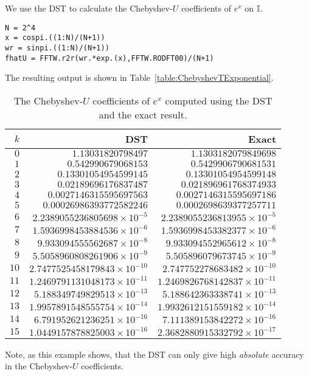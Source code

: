 \begin{example}\label{Example:DST}
We use the DST to calculate the Chebyshev-$U$ coefficients of $e^x$ on $\mathbb{I}$.
\begin{verbatim}
N = 2^4
x = cospi.((1:N)/(N+1))
wr = sinpi.((1:N)/(N+1))
fhatU = FFTW.r2r(wr.*exp.(x),FFTW.RODFT00)/(N+1)
\end{verbatim}
The resulting output is shown in Table~\ref{table:ChebyshevTExponential}.
\begin{table}[htdp]
\caption{The Chebyshev-$U$ coefficients of $e^x$ computed using the DST and the exact result.}
\begin{center}
\begin{tabular}{rrr}
\hline
$k$ & DST & Exact\\
\hline
$0$ & $1.13031820798497$ & $1.1303182079849698$\\
$1$ & $0.542990679068153$ & $0.5429906790681531$\\
$2$ & $0.13301054954599145$ & $0.13301054954599148$\\
$3$ & $0.02189696176837487$ & $0.021896961768374933$\\
$4$ & $0.0027146315595697563$ & $0.0027146315595697186$\\
$5$ & $0.00026986393772582246$ & $0.0002698639377257711$\\
$6$ & $2.2389055236805698\times10^{-5}$ & $2.2389055236813955\times10^{-5}$\\
$7$ & $1.5936998453884536\times10^{-6}$ & $1.5936998453382377\times10^{-6}$\\
$8$ & $9.933094555562687\times10^{-8}$ & $9.933094552965612\times10^{-8}$\\
$9$ & $5.5058960808261906\times10^{-9}$ & $5.505896079673745\times10^{-9}$\\
$10$ & $2.7477525458179843\times10^{-10}$ & $2.747752278683482\times10^{-10}$\\
$11$ & $1.2469791131048173\times10^{-11}$ & $1.2469826768142837\times10^{-11}$\\
$12$ & $5.188349749829513\times10^{-13}$ & $5.188642363338741\times10^{-13}$\\
$13$ & $1.9957891548555754\times10^{-14}$ & $1.9932612151559182\times10^{-14}$\\
$14$ & $6.791952621236251\times10^{-16}$ & $7.111389153842272\times10^{-16}$\\
$15$ & $1.0449157878825003\times10^{-16}$ & $2.3682880915332792\times10^{-17}$\\
\hline
\end{tabular}
\end{center}
\label{table:ChebyshevUExponential}
\end{table}%
Note, as this example shows, that the DST can only give high {\em absolute} accuracy in the Chebyshev-$U$ coefficients.
\end{example}

